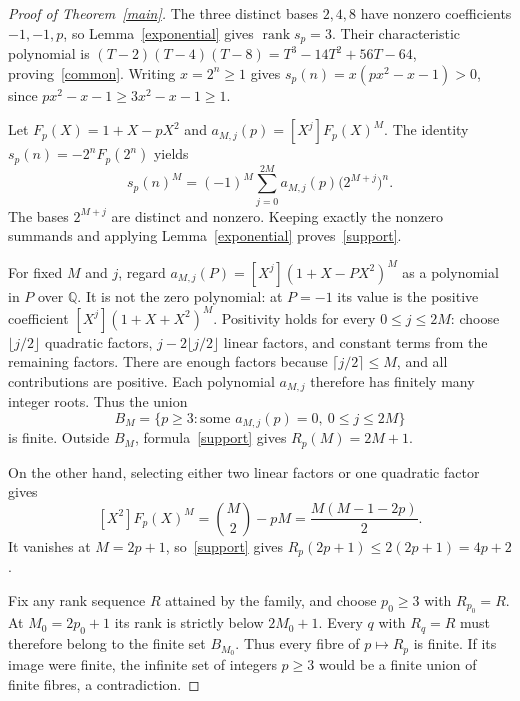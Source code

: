 \documentclass[11pt]{article}
\DeclareMathOperator{\rank}{rank}
\newcommand{\Q}{\mathbb{Q}}
\begin{document}
\begin{proof}[Proof of Theorem~\ref{main}]
The three distinct bases $2,4,8$ have nonzero coefficients $-1,-1,p$,
so Lemma~\ref{exponential} gives $\rank s_p=3$. Their characteristic
polynomial is
$(T-2)(T-4)(T-8)=T^3-14T^2+56T-64$, proving~\eqref{common}.
Writing $x=2^n\geq1$ gives
$s_p(n)=x(px^2-x-1)>0$, since
$px^2-x-1\geq3x^2-x-1\geq1$.

Let $F_p(X)=1+X-pX^2$ and $a_{M,j}(p)=[X^j]F_p(X)^M$. The identity
$s_p(n)=-2^nF_p(2^n)$ yields
\begin{equation}\label{expansion}
 s_p(n)^M=(-1)^M\sum_{j=0}^{2M}a_{M,j}(p)
                    \bigl(2^{M+j}\bigr)^n.
\end{equation}
The bases $2^{M+j}$ are distinct and nonzero. Keeping exactly the
nonzero summands and applying Lemma~\ref{exponential} proves~\eqref{support}.

For fixed $M$ and $j$, regard
$a_{M,j}(P)=[X^j](1+X-PX^2)^M$ as a polynomial in $P$ over $\Q$.
It is not the zero polynomial: at $P=-1$ its value is the positive
coefficient $[X^j](1+X+X^2)^M$. Positivity holds for every
$0\leq j\leq2M$: choose $\lfloor j/2\rfloor$ quadratic factors,
$j-2\lfloor j/2\rfloor$ linear factors, and constant terms from
the remaining factors. There are enough factors because
$\lceil j/2\rceil\leq M$, and all contributions are positive.
Each polynomial $a_{M,j}$ therefore has finitely many integer roots.
Thus the union
\[
 B_M=\{p\geq3:\text{some }a_{M,j}(p)=0,\ 0\leq j\leq2M\}
\]
is finite. Outside $B_M$, formula~\eqref{support} gives $R_p(M)=2M+1$.

On the other hand, selecting either two linear factors or one quadratic
factor gives
\begin{equation}\label{cancellation}
 [X^2]F_p(X)^M=\binom M2-pM
              =\frac{M(M-1-2p)}2.
\end{equation}
It vanishes at $M=2p+1$, so~\eqref{support} gives
$R_p(2p+1)\leq2(2p+1)=4p+2$.

Fix any rank sequence $R$ attained by the family, and choose $p_0\geq3$
with $R_{p_0}=R$. At $M_0=2p_0+1$ its rank is strictly below $2M_0+1$.
Every $q$ with $R_q=R$ must therefore belong to the finite set $B_{M_0}$.
Thus every fibre of $p\mapsto R_p$ is finite. If its image were finite,
the infinite set of integers $p\geq3$ would be a finite union of finite
fibres, a contradiction.
\end{proof}
\end{document}
